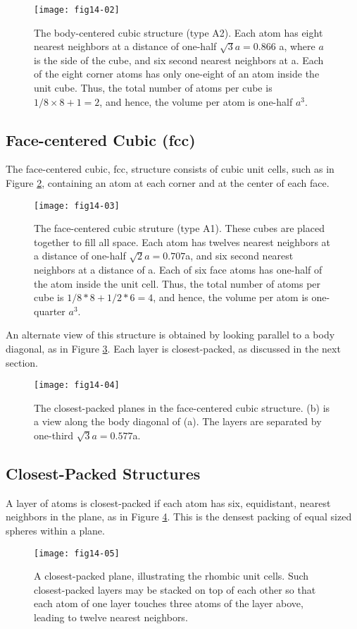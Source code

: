 \begin{figure}
\texttt{[image: fig14-02]}
\caption{The body-centered cubic structure (type A2). 
Each atom has eight nearest neighbors at a distance of one-half
$\sqrt{3}a = 0.866$ a, where $a$ is the side of the cube, and six
second nearest neighbors at a.  Each of the eight corner atoms has
only one-eight of an atom inside the unit cube.  Thus, the total
number of atoms per cube is $1/8 \times 8 + 1 = 2$, and hence, the
volume per atom is one-half $a^3$.}
\label{chap14-fig1}
\end{figure}


\subsection{Face-centered Cubic (fcc)}

The face-centered cubic, fcc, structure consists of cubic unit cells,
such as in Figure \ref{chap14-fig2}, containing an atom at each corner
and at the center of each face.

\begin{figure}
\texttt{[image: fig14-03]}
\caption{The face-centered cubic  struture (type A1).  These
cubes are placed together to fill all space.  Each atom has twelves
nearest neighbors at a distance of one-half $\sqrt{2} a = 0.707$a, and
six second nearest neighbors at a distance of a.  Each of six face
atoms has one-half of the atom inside the unit cell.  Thus, the total
number of atoms per cube is $1/8 * 8 + 1/2 * 6 = 4$, and hence, the
volume per atom is one-quarter $a^3$.  }
\label{chap14-fig2}
\end{figure}


An alternate view of this structure is obtained by looking parallel to
a body diagonal, as in Figure \ref{chap14-fig3}.  Each layer is
closest-packed, as discussed in the next section.

\begin{figure}
\texttt{[image: fig14-04]}
\caption{The closest-packed planes in the 
face-centered cubic structure. (b) is a view along the body diagonal
of (a).  The layers are separated by one-third $\sqrt{3}a = 0.577$a.}
\label{chap14-fig3}
\end{figure}

\subsection{Closest-Packed Structures}

A layer of atoms is closest-packed if each atom has six, equidistant,
nearest neighbors in the plane, as in Figure \ref{chap14-fig4}.  This
is the densest packing of equal sized spheres within a plane.
\begin{figure}
\texttt{[image: fig14-05]}
\caption{A closest-packed plane, illustrating the rhombic unit 
cells.  Such closest-packed layers may be stacked on top of each other
so that each atom of one layer touches three atoms of the layer above,
leading to twelve nearest neighbors.}
\label{chap14-fig4}
\end{figure}


